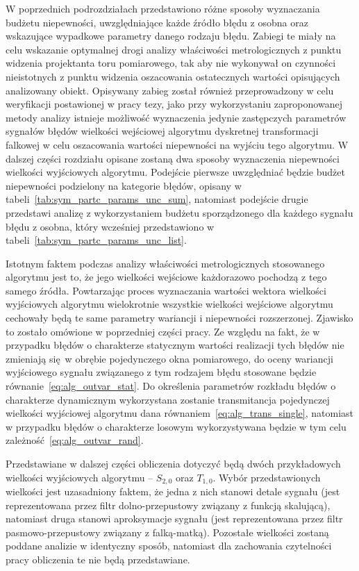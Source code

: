 W poprzednich podrozdziałach przedstawiono różne sposoby wyznaczania budżetu niepewności, uwzględniające każde źródło błędu z osobna oraz wskazujące wypadkowe parametry danego rodzaju błędu. Zabiegi te miały na celu wskazanie optymalnej drogi analizy właściwości metrologicznych z punktu widzenia projektanta toru pomiarowego, tak aby nie wykonywał on czynności nieistotnych z punktu widzenia oszacowania ostatecznych wartości opisujących analizowany obiekt. Opisywany zabieg został również przeprowadzony w celu weryfikacji postawionej w pracy tezy, jako przy wykorzystaniu zaproponowanej metody analizy istnieje możliwość wyznaczenia jedynie zastępczych parametrów sygnałów błędów wielkości wejściowej algorytmu dyskretnej transformacji falkowej w celu oszacowania wartości niepewności na wyjściu tego algorytmu. W dalszej części rozdziału opisane zostaną dwa sposoby wyznaczenia niepewności wielkości wyjściowych algorytmu. Podejście pierwsze uwzględniać będzie budżet niepewności podzielony na kategorie błędów, opisany w tabeli~\ref{tab:sym_partc_params_unc_sum}, natomiast podejście drugie przedstawi analizę z wykorzystaniem budżetu sporządzonego dla każdego sygnału błędu z osobna, który wcześniej przedstawiono w tabeli~\ref{tab:sym_partc_params_unc_list}.

Istotnym faktem podczas analizy właściwości metrologicznych stosowanego algorytmu jest to, że jego wielkości wejściowe każdorazowo pochodzą z tego samego źródła. Powtarzając proces wyznaczania wartości wektora wielkości wyjściowych algorytmu wielokrotnie wszystkie wielkości wejściowe algorytmu cechowały będą te same parametry wariancji i niepewności rozszerzonej. Zjawisko to zostało omówione w poprzedniej części pracy. Ze względu na fakt, że w przypadku błędów o charakterze statycznym wartości realizacji tych błędów nie zmieniają się w obrębie pojedynczego okna pomiarowego, do oceny wariancji wyjściowego sygnału związanego z tym rodzajem błędu stosowane będzie równanie~\eqref{eq:alg_outvar_stat}. Do określenia parametrów rozkładu błędów o charakterze dynamicznym wykorzystana zostanie transmitancja pojedynczej wielkości wyjściowej algorytmu dana równaniem~\eqref{eq:alg_trans_single}, natomiast w przypadku błędów o charakterze losowym wykorzystywana będzie w tym celu zależność~\eqref{eq:alg_outvar_rand}.

Przedstawiane w dalszej części obliczenia dotyczyć będą dwóch przykładowych wielkości wyjściowych algorytmu -- $S_{2,0}$ oraz $T_{1,0}$. Wybór przedstawionych wielkości jest uzasadniony faktem, że jedna z nich stanowi detale sygnału (jest reprezentowana przez filtr dolno-przepustowy związany z funkcją skalującą), natomiast druga stanowi aproksymacje sygnału (jest reprezentowana przez filtr pasmowo-przepustowy związany z falką-matką). Pozostałe wielkości zostaną poddane analizie w identyczny sposób, natomiast dla zachowania czytelności pracy obliczenia te nie będą przedstawiane.

